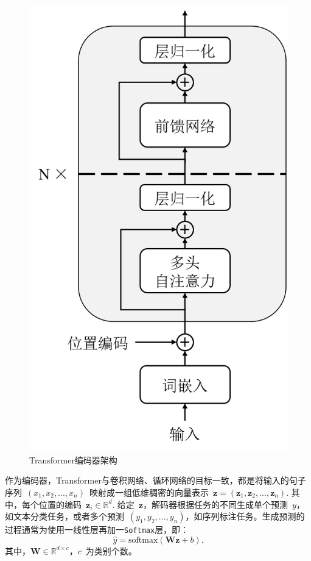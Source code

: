 \begin{figure}[htb]
	\centering
	\includegraphics[scale=0.6]{tf.png}
	\caption{Transformer编码器架构}
	\label{fig:tf_encoder}
\end{figure}

作为编码器，Transformer与卷积网络、循环网络的目标一致，都是将输入的句子序列~$(x_1, x_2, ..., x_n)$~映射成一组低维稠密的向量表示~$\mathbf{z} = (\mathbf{z}_1, \mathbf{z}_2, ..., \mathbf{z}_n)$. 其中，每个位置的编码~$\mathbf{z}_i \in \mathbb{R}^{d}$. 给定~$\mathbf{z}$，解码器根据任务的不同生成单个预测~$y$，如文本分类任务，或者多个预测~$(y_1, y_2, ..., y_n)$，如序列标注任务。生成预测的过程通常为使用一线性层再加一\texttt{Softmax}层，即：
\begin{equation}
	\hat{y} = \mathrm{softmax}(\mathbf{W}\mathbf{z} + b).
\end{equation}
其中，$\mathbf{W}\in \mathbb{R}^{d\times c}$，$c$~为类别个数。

